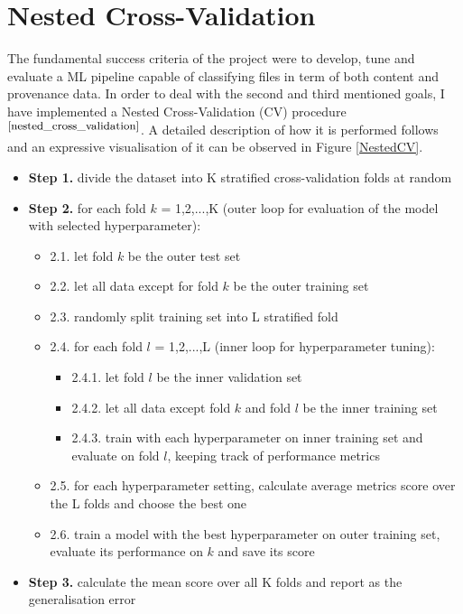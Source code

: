\section{Nested Cross-Validation} \label{nested_cross_validation}

The fundamental success criteria of the project were to develop, tune and evaluate a ML pipeline capable of classifying files in term of both content and provenance data. In order to deal with the second and third mentioned goals, I have implemented a Nested Cross-Validation (CV) procedure$^{\small \cite{nested_cross_validation}}$. A detailed description of how it is performed follows and an expressive visualisation of it can be observed in Figure \ref{NestedCV}. 

\begin{itemize}[label={}]
  \item \textbf{Step 1.} divide the dataset into K stratified cross-validation folds at random
  \item \textbf{Step 2.} for each fold $k$ = 1,2,...,K (outer loop for evaluation of the model with selected hyperparameter):
        \begin{itemize}[label={}]
          \item 2.1. let fold $k$ be the outer test set
          \item 2.2. let all data except for fold $k$ be the outer training set
          \item 2.3. randomly split training set into L stratified fold
          \item 2.4. for each fold $l$ = 1,2,...,L (inner loop for hyperparameter tuning):
                \begin{itemize}[label={}]
                  \item 2.4.1. let fold $l$ be the inner validation set
                  \item 2.4.2. let all data except fold $k$ and fold $l$ be the inner training set
                  \item 2.4.3. train with each hyperparameter on inner training set and evaluate on fold $l$, keeping track of performance metrics
                \end{itemize}
          \item 2.5. for each hyperparameter setting, calculate average metrics score over the L folds and choose the best one
          \item 2.6. train a model with the best hyperparameter on outer training set, evaluate its performance on $k$ and save its score
        \end{itemize}
  \item \textbf{Step 3.} calculate the mean score over all K folds and report as the generalisation error
\end{itemize} 


